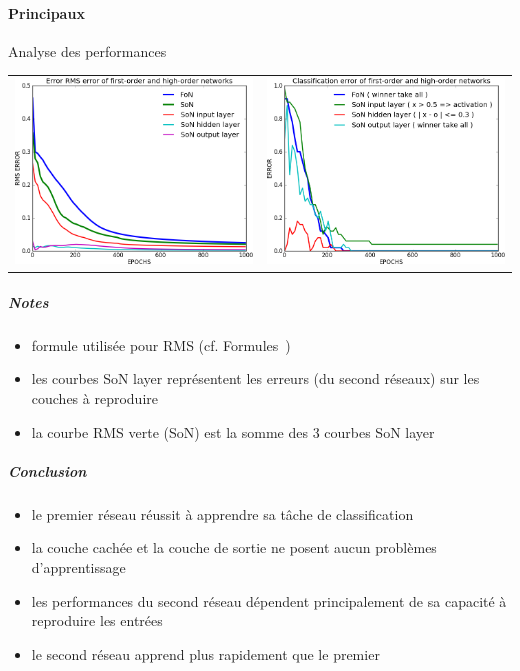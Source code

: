     \paragraph{Principaux}
      Analyse des performances
      \begin{center}
	\begin{tabular}{lr}
	  \hspace*{-1cm}
	  \includegraphics[width=250px]{data/expA1/rms.png}
	  &
	  \includegraphics[width=250px]{data/expA1/err.png} 
	\end{tabular}
      \end{center}
      \subparagraph{Notes}
	\begin{itemize}
	  \item formule utilisée pour RMS (cf. Formules~)
	  \item les courbes SoN layer représentent les erreurs (du second réseaux) sur les couches à reproduire 
	  \item la courbe RMS verte (SoN) est la somme des 3 courbes SoN layer
	\end{itemize}
      \subparagraph{Conclusion}
	\begin{itemize}
	  \item le premier réseau réussit à apprendre sa tâche de classification
	  \item la couche cachée et la couche de sortie ne posent aucun problèmes d'apprentissage
	  \item les performances du second réseau dépendent principalement de sa capacité à reproduire les entrées
	  \item le second réseau apprend plus rapidement que le premier
	\end{itemize}
